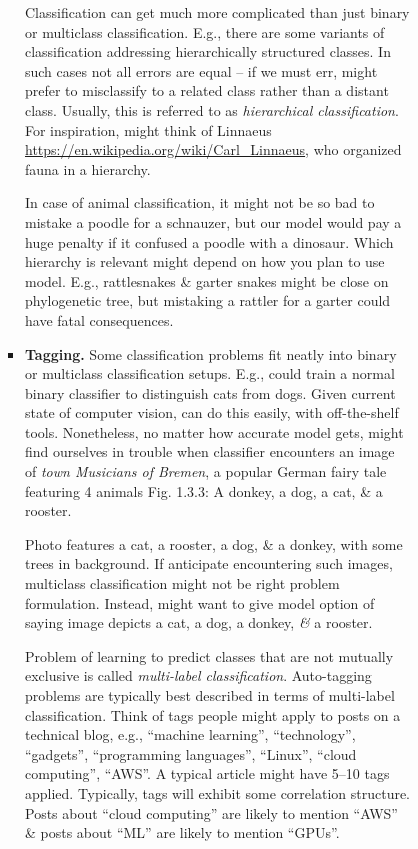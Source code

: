 \documentclass{article}
\begin{document}
\begin{enumerate}
\begin{itemize}
\begin{itemize}
\begin{itemize}
\begin{itemize}
					Classification can get much more complicated than just binary or multiclass classification. E.g., there are some variants of classification addressing hierarchically structured classes. In such cases not all errors are equal -- if we must err, might prefer to misclassify to a related class rather than a distant class. Usually, this is referred to as {\it hierarchical classification}. For inspiration, might think of {\sc Linnaeus} \url{https://en.wikipedia.org/wiki/Carl_Linnaeus}, who organized fauna in a hierarchy.
					
					In case of animal classification, it might not be so bad to mistake a poodle for a schnauzer, but our model would pay a huge penalty if it confused a poodle with a dinosaur. Which hierarchy is relevant might depend on how you plan to use model. E.g., rattlesnakes \& garter snakes might be close on phylogenetic tree, but mistaking a rattler for a garter could have fatal consequences.
					\item {\bf Tagging.} Some classification problems fit neatly into binary or multiclass classification setups. E.g., could train a normal binary classifier to distinguish cats from dogs. Given current state of computer vision, can do this easily, with off-the-shelf tools. Nonetheless, no matter how accurate model gets, might find ourselves in trouble when classifier encounters an image of {\it town Musicians of Bremen}, a popular German fairy tale featuring 4 animals {\sf Fig. 1.3.3: A donkey, a dog, a cat, \& a rooster}.
					
					Photo features a cat, a rooster, a dog, \& a donkey, with some trees in background. If anticipate encountering such images, multiclass classification might not be right problem formulation. Instead, might want to give model option of saying image depicts a cat, a dog, a donkey, {\it\&} a rooster.
					
					Problem of learning to predict classes that are not mutually exclusive is called {\it multi-label classification}. Auto-tagging problems are typically best described in terms of multi-label classification. Think of tags people might apply to posts on a technical blog, e.g., ``machine learning'', ``technology'', ``gadgets'', ``programming languages'', ``Linux'', ``cloud computing'', ``AWS''. A typical article might have 5--10 tags applied. Typically, tags will exhibit some correlation structure. Posts about ``cloud computing'' are likely to mention ``AWS'' \& posts about ``ML'' are likely to mention ``GPUs''.
					

\end{itemize}
\end{itemize}
\end{itemize}
\end{itemize}
\end{enumerate}
\end{document}
